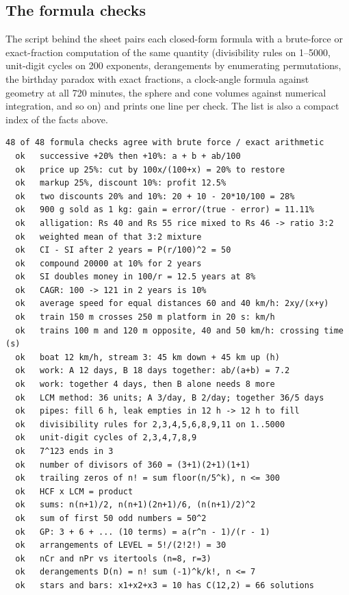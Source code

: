 \documentclass[10pt,a4paper,openany,oneside]{report}
\newcommand{\prio}[1]{\texorpdfstring{\ifcase#1\or{\color{gold}\ding{72}}\or{\color{gold}\ding{72}\ding{72}}\or{\color{gold}\ding{72}\ding{72}\ding{72}}\fi}{}}
\begin{document}
\subsection{The formula checks \prio{1}}\label{sec:formcheck}
The script behind the sheet pairs each closed-form formula with a brute-force or exact-fraction computation of the same quantity (divisibility rules on 1--5000, unit-digit cycles on 200 exponents, derangements by enumerating permutations, the birthday paradox with exact fractions, a clock-angle formula against geometry at all 720 minutes, the sphere and cone volumes against numerical integration, and so on) and prints one line per check. The list is also a compact index of the facts above.
\begin{lstlisting}[style=out,basicstyle=\ttfamily\fontsize{7.2}{8.6}\selectfont,title={48 formula checks}]
48 of 48 formula checks agree with brute force / exact arithmetic
  ok   successive +20% then +10%: a + b + ab/100
  ok   price up 25%: cut by 100x/(100+x) = 20% to restore
  ok   markup 25%, discount 10%: profit 12.5%
  ok   two discounts 20% and 10%: 20 + 10 - 20*10/100 = 28%
  ok   900 g sold as 1 kg: gain = error/(true - error) = 11.11%
  ok   alligation: Rs 40 and Rs 55 rice mixed to Rs 46 -> ratio 3:2
  ok   weighted mean of that 3:2 mixture
  ok   CI - SI after 2 years = P(r/100)^2 = 50
  ok   compound 20000 at 10% for 2 years
  ok   SI doubles money in 100/r = 12.5 years at 8%
  ok   CAGR: 100 -> 121 in 2 years is 10%
  ok   average speed for equal distances 60 and 40 km/h: 2xy/(x+y)
  ok   train 150 m crosses 250 m platform in 20 s: km/h
  ok   trains 100 m and 120 m opposite, 40 and 50 km/h: crossing time (s)
  ok   boat 12 km/h, stream 3: 45 km down + 45 km up (h)
  ok   work: A 12 days, B 18 days together: ab/(a+b) = 7.2
  ok   work: together 4 days, then B alone needs 8 more
  ok   LCM method: 36 units; A 3/day, B 2/day; together 36/5 days
  ok   pipes: fill 6 h, leak empties in 12 h -> 12 h to fill
  ok   divisibility rules for 2,3,4,5,6,8,9,11 on 1..5000
  ok   unit-digit cycles of 2,3,4,7,8,9
  ok   7^123 ends in 3
  ok   number of divisors of 360 = (3+1)(2+1)(1+1)
  ok   trailing zeros of n! = sum floor(n/5^k), n <= 300
  ok   HCF x LCM = product
  ok   sums: n(n+1)/2, n(n+1)(2n+1)/6, (n(n+1)/2)^2
  ok   sum of first 50 odd numbers = 50^2
  ok   GP: 3 + 6 + ... (10 terms) = a(r^n - 1)/(r - 1)
  ok   arrangements of LEVEL = 5!/(2!2!) = 30
  ok   nCr and nPr vs itertools (n=8, r=3)
  ok   derangements D(n) = n! sum (-1)^k/k!, n <= 7
  ok   stars and bars: x1+x2+x3 = 10 has C(12,2) = 66 solutions

\end{lstlisting}
\end{document}
